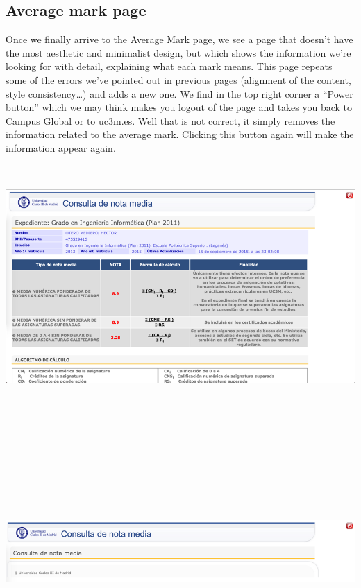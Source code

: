 \documentclass{article}
\begin{document}
\subsection{Average mark page}
Once we finally arrive to the Average Mark page, we see a page that doesn’t have the most aesthetic and minimalist design, but which shows the information we’re looking for with detail, explaining what each mark means. This page repeats some of the errors we’ve pointed out in previous pages (alignment of the content, style consistency…) and adds a new one. We find in the top right corner a “Power button” which we may think makes you logout of the page and takes you back to Campus Global or to uc3m.es. Well that is not correct, it simply removes the information related to the average mark. Clicking this button again will make the information appear again. \vspace{0.2cm} \\
\includegraphics[width=15cm, height=10cm, keepaspectratio]{notamedia}\vspace{0.3cm} \\
\includegraphics[width=15cm, height=10cm, keepaspectratio]{power}\vspace{0.3cm} \\
\end{document}
